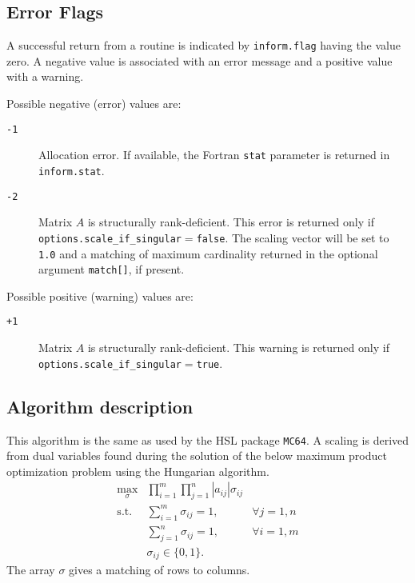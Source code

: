 
\subsection{Error Flags} \label{returns:hungarian}
A successful return from a routine is indicated by \texttt{inform.flag} having the value zero. A negative value is associated with an error message and a positive value with a warning.

Possible negative (error) values are:
\begin{description}
\item[\texttt{-1}] Allocation error. If available, the Fortran \texttt{stat} parameter is returned in \texttt{inform.stat}.
\item[\texttt{-2}] Matrix $A$ is structurally rank-deficient. This error is
   returned only if
   \texttt{options.scale\_if\_singular}$=$\texttt{false}. The scaling vector
   will be set to \texttt{1.0} and a matching of maximum cardinality returned
   in the optional argument \texttt{match[]}, if present.
\end{description}

Possible positive (warning) values are:
\begin{description}
\item[\texttt{+1}] Matrix $A$ is structurally rank-deficient. This warning is
   returned only if
   \texttt{options.scale\_if\_singular}$=$\texttt{true}.
\end{description}

\subsection{Algorithm description}

This algorithm is the same as used by the HSL package \texttt{MC64}. A scaling
is derived from dual variables found during the solution of the below
maximum product optimization problem using the Hungarian algorithm.
\begin{eqnarray*}
   \max_{\sigma} & \prod_{i=1}^m\prod_{j=1}^n |a_{ij}|\sigma_{ij} & \\
   \mathrm{s.t.} & \sum_{i=1}^m\sigma_{ij} = 1, & \forall j=1,n \\
                 & \sum_{j=1}^n\sigma_{ij} = 1, & \forall i=1,m \\
                 & \sigma_{ij} \in \{0,1\}.
\end{eqnarray*}
The array $\sigma$ gives a matching of rows to columns.

